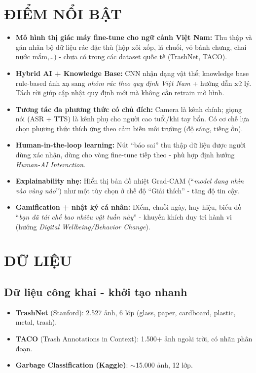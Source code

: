 \documentclass[13pt,a4paper,oneside]{report}
\begin{document}
\chapter{ĐIỂM NỔI BẬT}

\begin{itemize}[leftmargin=1.5cm]
    \item \textbf{Mô hình thị giác máy fine-tune cho ngữ cảnh Việt Nam:} Thu thập và gán nhãn bộ dữ liệu rác đặc thù (hộp xôi xốp, lá chuối, vỏ bánh chưng, chai nước mắm,\ldots) - chưa có trong các dataset quốc tế (TrashNet, TACO).
    \item \textbf{Hybrid AI + Knowledge Base:} CNN nhận dạng vật thể; knowledge base rule-based ánh xạ sang \textit{nhóm rác theo quy định Việt Nam} + hướng dẫn xử lý. Tách rời giúp cập nhật quy định mới mà không cần retrain mô hình.
    \item \textbf{Tương tác đa phương thức có chủ đích:} Camera là kênh chính; giọng nói (ASR + TTS) là kênh phụ cho người cao tuổi/khi tay bẩn. Có cơ chế lựa chọn phương thức thích ứng theo cảm biến môi trường (độ sáng, tiếng ồn).
    \item \textbf{Human-in-the-loop learning:} Nút ``báo sai'' thu thập dữ liệu được người dùng xác nhận, dùng cho vòng fine-tune tiếp theo - phù hợp định hướng \textit{Human-AI Interaction}.
    \item \textbf{Explainability nhẹ:} Hiển thị bản đồ nhiệt Grad-CAM (``\textit{model đang nhìn vào vùng nào}'') như một tùy chọn ở chế độ ``Giải thích'' - tăng độ tin cậy.
    \item \textbf{Gamification + nhật ký cá nhân:} Điểm, chuỗi ngày, huy hiệu, biểu đồ ``\textit{bạn đã tái chế bao nhiêu vật tuần này}'' - khuyến khích duy trì hành vi (hướng \textit{Digital Wellbeing/Behavior Change}).
\end{itemize}

\chapter{DỮ LIỆU}

\section{Dữ liệu công khai - khởi tạo nhanh}

\begin{itemize}[leftmargin=1.5cm]
    \item \textbf{TrashNet} (Stanford): 2.527 ảnh, 6 lớp (glass, paper, cardboard, plastic, metal, trash).
    \item \textbf{TACO} (Trash Annotations in Context): 1.500+ ảnh ngoài trời, có nhãn phân đoạn.
    \item \textbf{Garbage Classification (Kaggle)}: $\sim$15.000 ảnh, 12 lớp.
\end{itemize}
\end{document}
